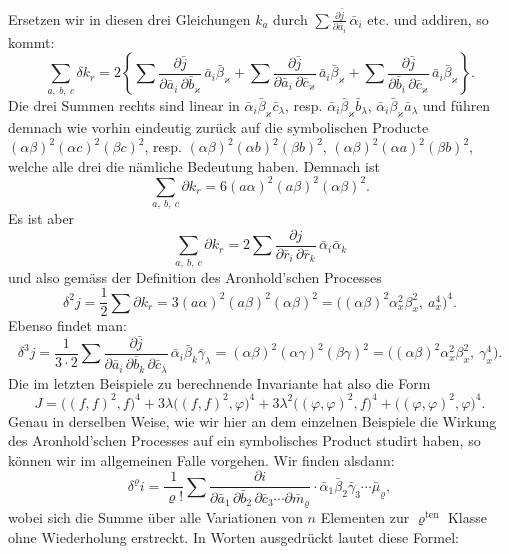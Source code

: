 Ersetzen wir in diesen drei Gleichungen $k_a$ durch $\displaystyle\sum \frac{\partial \bar j}{\partial \bar a_i}\,\bar\alpha_i$ etc. und addiren, so kommt:
\[
\sum_{a,\ b,\ c} \delta k_r = 2\left\{ \sum \frac{\partial \bar j}{\partial \bar a_i\,\partial \bar b_\varkappa}\,\bar a_i\bar\beta_\varkappa + \sum \frac{\partial \bar j}{\partial \bar a_i\,\partial \bar c_\varkappa}\,\bar a_i\bar\beta_\varkappa + \sum \frac{\partial \bar j}{\partial \bar b_i\,\partial \bar c_\varkappa}\,\bar a_i\bar\beta_\varkappa \right\}.
\]
Die drei Summen rechts sind linear in $\bar\alpha_i\bar\beta_\varkappa\bar c_\lambda$, resp. $\bar\alpha_i\bar\beta_\varkappa\bar b_\lambda$, $\bar\alpha_i\bar\beta_\varkappa\bar a_\lambda$ und führen demnach wie vorhin eindeutig zurück auf die symbolischen Producte $(\alpha\beta)^2(\alpha c)^2(\beta c)^2$, resp. $(\alpha\beta)^2(\alpha b)^2(\beta b)^2$, $(\alpha\beta)^2(\alpha a)^2(\beta b)^2$, welche alle drei die nämliche Bedeutung haben. Demnach ist
\[
\sum_{a,\ b,\ c} \partial k_r = 6(a\alpha)^2(a\beta)^2(\alpha\beta)^2.
\]
Es ist aber
\[
\sum_{a,\ b,\ c} \partial k_r = 2\sum \frac{\partial j}{\partial \bar r_i\,\partial \bar r_k}\,\bar\alpha_i\bar\alpha_k
\]
und also gemäss der Definition des Aronhold'schen Processes
\[
\delta^2 j = \frac{1}{2}\sum \partial k_r = 3(a\alpha)^2(a\beta)^2(\alpha\beta)^2 = \big((\alpha\beta)^2\alpha_x^2\beta_x^2,\ a_x^4\big)^4.
\]
Ebenso findet man:
\[
\delta^3 j = \frac{1}{3\cdot 2}\sum \frac{\partial \bar j}{\partial \bar a_i\,\partial \bar b_k\,\partial \bar c_\lambda}\,\bar\alpha_i\bar\beta_k\bar\gamma_\lambda = (\alpha\beta)^2(\alpha\gamma)^2(\beta\gamma)^2 = \big((\alpha\beta)^2\alpha_x^2\beta_x^2,\ \gamma_x^4\big).
\]
Die im letzten Beispiele zu berechnende Invariante hat also die Form
\[
J = \big((f,f)^2,f\big)^4 + 3\lambda\big((f,f)^2,\varphi\big)^4 + 3\lambda^2\big((\varphi,\varphi)^2,f\big)^4 + \big((\varphi,\varphi)^2,\varphi\big)^4.
\]
Genau in derselben Weise, wie wir hier an dem einzelnen Beispiele die Wirkung des Aronhold'schen Processes auf ein symbolisches Product studirt haben, so können wir im allgemeinen Falle vorgehen. Wir finden alsdann:
\[
\delta^\varrho i = \frac{1}{\varrho!}\sum \frac{\partial i}{\partial \bar a_1\,\partial \bar b_2\,\partial \bar c_3\cdots \partial \bar m_\varrho}\cdot \bar\alpha_1\bar\beta_2\bar\gamma_3\cdots \bar\mu_\varrho,
\]
wobei sich die Summe über alle Variationen von $n$ Elementen zur $\varrho^{\text{ten}}$ Klasse ohne Wiederholung erstreckt. In Worten ausgedrückt lautet diese Formel:

